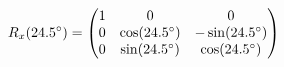 \documentclass[preview]{standalone}
\begin{document}
\begin{align*}
\special{dvisvgm:raw <g id='unique000'>}R_x(24.5^\circ) = \begin{pmatrix} 1 & 0 & 0 \\ 0 & \cos(24.5^\circ) & -\sin(24.5^\circ) \\ 0 & \sin(24.5^\circ) & \cos(24.5^\circ) \end{pmatrix}\special{dvisvgm:raw </g>}
\end{align*}
\end{document}
